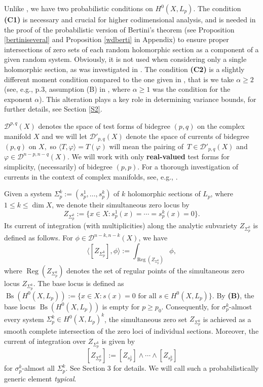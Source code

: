 \documentclass[11pt,leqno,oneside]{amsart}
\numberwithin{equation}{section}
\begin{document}
Unlike \cite{BCM}, we have two probabilistic conditions on $H^{0}(X, L_{p})$. The condition \textbf{(C1)} is necessary and crucial for higher codimensional analysis, and is needed in the proof of the probabilistic version of Bertini’s theorem (see Proposition \ref{bertiniseveral} and Proposition \ref{wdberti} in Appendix) to ensure proper intersections of zero sets of each random holomorphic section as a component of a given random system. Obviously, it is not used when considering only a single holomorphic section, as was investigated in \cite{BCM}. The condition \textbf{(C2)} is a slightly different moment condition compared to the one given in \cite{BCM}, that is we take $\alpha \geq 2$ (see, e.g., p.3, assumption (B) in \cite{BCM}, where $\alpha \geq 1$ was the condition for the exponent $\alpha$). This alteration plays a key role in determining variance bounds, for further details, see Section \ref{S2}.


$\mathcal{D}^{p, q}(X)$ denotes the space of test forms of bidegree $(p, q)$ on the complex manifold $X$ and  we will let $\mathcal{D'}_{p, q}(X)$ denote the space of currents of bidegree $(p, q)$ on $X,$ so $\langle T, \varphi\rangle=T(\varphi)$ will mean the pairing of \,$T\in \mathcal{D'}_{p, q}(X)$ and $\varphi\in \mathcal{D}^{n-p, n-q}(X)$. We will work with only \textbf{real-valued} test forms for simplicity, (necessarily) of bidegree $(p, p)$. For a thorough investigation of currents in the context of complex manifolds, see, e.g.,  \cite{Dem12}.







Given a system \( \Sigma_{p}^{k}:= (s^{1}_{p}, \ldots, s^{k}_{p}) \) of \( k \) holomorphic sections of \( L_{p} \), where \( 1 \leq k \leq \dim X \), we denote their simultaneous zero locus by
$$
Z_{\Sigma_{p}^{k}} := \{ x \in X : s_{p}^{1}(x) = \cdots = s_{p}^{k}(x) = 0 \}.
$$
Its current of integration (with multiplicities) along the analytic subvariety \( Z_{\Sigma_{p}^{k}} \) is defined as follows. For \( \phi \in \mathcal{D}^{n-k, n-k}(X) \), we have
$$
\langle [Z_{\Sigma_{p}^{k}}], \phi \rangle := \int_{\operatorname{Reg}(Z_{\Sigma_{p}^{k}})} \phi,
$$
where \( \operatorname{Reg}(Z_{\Sigma_{p}^{k}}) \) denotes the set of regular points of the simultaneous zero locus \( Z_{\Sigma_{p}^{k}} \). The base locus is defined as \( \operatorname{Bs}(H^{0}(X, L_{p})):=\{x\in X: s(x)=0 \,\,\text{for} \,\,\text{all}\,\, s\in H^{0}(X, L_{p}) \} \). By \textbf{(B)}, the base locus \( \operatorname{Bs}(H^{0}(X, L_{p})) \) is empty for \( p \geq p_{0} \). Consequently, for $\sigma_{p}^{k}$-almost every system $\Sigma_{p}^{k}\in H^{0}(X, L_{p})^{k}$, the simultaneous zero set $Z_{\Sigma_{p}^{k}}$ is achieved as a smooth complete intersection of the zero loci of individual sections. Moreover, the current of integration over $Z_{\Sigma_{p}^{k}}$ is given by $$[Z_{\Sigma_{p}^{k}}]:=[Z_{s_{p}^{1}}]\wedge \cdots \wedge [Z_{s_{p}^{k}}]$$
for $\sigma^{k}_{p}$-almost all $\Sigma_{p}^{k}$. See Section 3 for details. We will call such a probabilistically generic element \textit{typical}.
\end{document}
